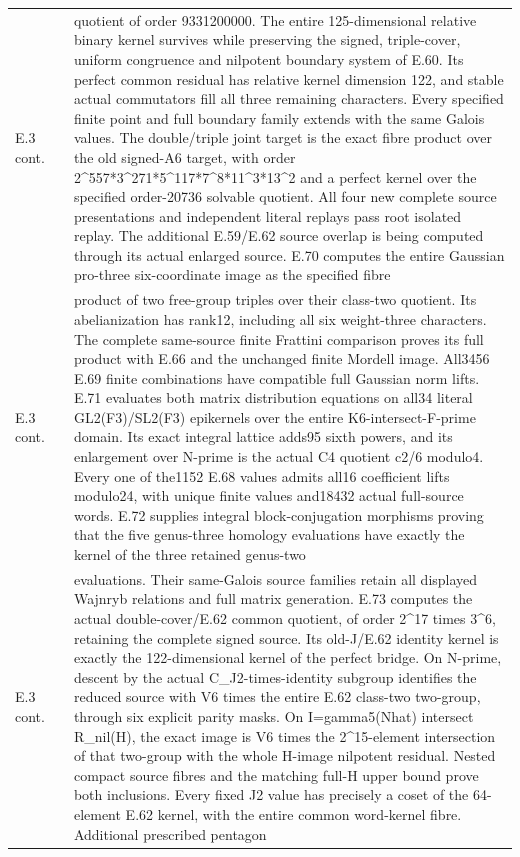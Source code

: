 \begin{longtable}{@{}p{1.1cm}p{3.0cm}p{10.3cm}@{}}
E.3 cont. &  & quotient of order 9331200000. The entire 125-dimensional relative binary kernel survives while preserving the signed, triple-cover, uniform congruence and nilpotent boundary system of E.60. Its perfect common residual has relative kernel dimension 122, and stable actual commutators fill all three remaining characters. Every specified finite point and full boundary family extends with the same Galois values. The double/triple joint target is the exact fibre product over the old signed-A6 target, with order 2\textasciicircum{}557*3\textasciicircum{}271*5\textasciicircum{}117*7\textasciicircum{}8*11\textasciicircum{}3*13\textasciicircum{}2 and a perfect kernel over the specified order-20736 solvable quotient. All four new complete source presentations and independent literal replays pass root isolated replay. The additional E.59/E.62 source overlap is being computed through its actual enlarged source. E.70 computes the entire Gaussian pro-three six-coordinate image as the specified fibre  \\
E.3 cont. &  & product of two free-group triples over their class-two quotient. Its abelianization has rank12, including all six weight-three characters. The complete same-source finite Frattini comparison proves its full product with E.66 and the unchanged finite Mordell image. All3456 E.69 finite combinations have compatible full Gaussian norm lifts. E.71 evaluates both matrix distribution equations on all34 literal GL2(F3)/SL2(F3) epikernels over the entire K6-intersect-F-prime domain. Its exact integral lattice adds95 sixth powers, and its enlargement over N-prime is the actual C4 quotient c2/6 modulo4. Every one of the1152 E.68 values admits all16 coefficient lifts modulo24, with unique finite values and18432 actual full-source words. E.72 supplies integral block-conjugation morphisms proving that the five genus-three homology evaluations have exactly the kernel of the three retained genus-two  \\
E.3 cont. &  & evaluations. Their same-Galois source families retain all displayed Wajnryb relations and full matrix generation. E.73 computes the actual double-cover/E.62 common quotient, of order 2\textasciicircum{}17 times 3\textasciicircum{}6, retaining the complete signed source. Its old-J/E.62 identity kernel is exactly the 122-dimensional kernel of the perfect bridge. On N-prime, descent by the actual C\_J2-times-identity subgroup identifies the reduced source with V6 times the entire E.62 class-two two-group, through six explicit parity masks. On I=gamma5(Nhat) intersect R\_nil(H), the exact image is V6 times the 2\textasciicircum{}15-element intersection of that two-group with the whole H-image nilpotent residual. Nested compact source fibres and the matching full-H upper bound prove both inclusions. Every fixed J2 value has precisely a coset of the 64-element E.62 kernel, with the entire common word-kernel fibre. Additional prescribed pentagon  \\

\end{longtable}
